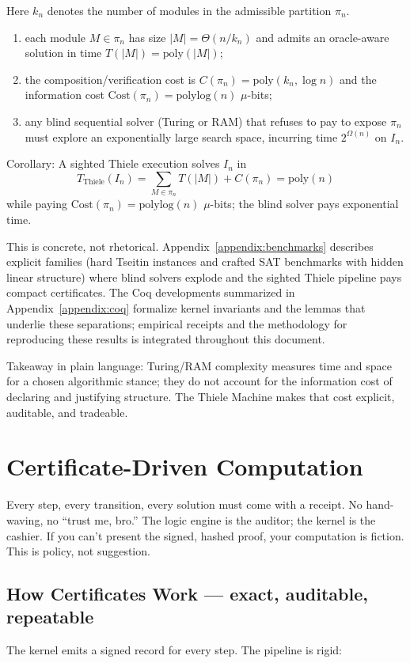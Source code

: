 \documentclass[11pt]{article}
\begin{document}
Here $k_n$ denotes the number of modules in the admissible partition $\pi_n$.

\begin{enumerate}
  \item each module $M\in\pi_n$ has size $|M|=\Theta(n/k_n)$ and admits an oracle-aware solution in time $T(|M|)=\mathrm{poly}(|M|)$;
  \item the composition/verification cost is $C(\pi_n)=\mathrm{poly}(k_n,\log n)$ and the information cost \(\mathrm{Cost}(\pi_n)=\mathrm{polylog}(n)\) \(\mu\)-bits;
  \item any blind sequential solver (Turing or RAM) that refuses to pay to expose $\pi_n$ must explore an exponentially large search space, incurring time $2^{\Omega(n)}$ on $I_n$.
\end{enumerate}

Corollary: A sighted Thiele execution solves $I_n$ in
\[
T_{\mathrm{Thiele}}(I_n)=\sum_{M\in\pi_n}T(|M|)+C(\pi_n)=\mathrm{poly}(n)
\]
while paying $\mathrm{Cost}(\pi_n)=\mathrm{polylog}(n)$ $\mu$-bits; the blind solver pays exponential time.

This is concrete, not rhetorical. Appendix~\ref{appendix:benchmarks} describes explicit families (hard Tseitin instances and crafted SAT benchmarks with hidden linear structure) where blind solvers explode and the sighted Thiele pipeline pays compact certificates. The Coq developments summarized in Appendix~\ref{appendix:coq} formalize kernel invariants and the lemmas that underlie these separations; empirical receipts and the methodology for reproducing these results is integrated throughout this document.

Takeaway in plain language: Turing/RAM complexity measures time and space for a chosen algorithmic stance; they do not account for the information cost of declaring and justifying structure. The Thiele Machine makes that cost explicit, auditable, and tradeable.

\section{Certificate-Driven Computation}
Every step, every transition, every solution must come with a receipt. No hand-waving, no “trust me, bro.” The logic engine is the auditor; the kernel is the cashier. If you can’t present the signed, hashed proof, your computation is fiction. This is policy, not suggestion.

\subsection{How Certificates Work — exact, auditable, repeatable}
The kernel emits a signed record for every step. The pipeline is rigid:
\end{document}
